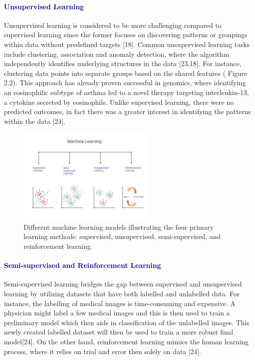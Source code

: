 \documentclass[12pt,a4paper]{article}
\begin{document}
\paragraph{\textcolor{darkblue}{Unsupervised Learning}} 
Unsupervised learning is considered to be more challenging compared to supervised learning since the former focuses on discovering patterns or groupings within data without predefined targets [18]. Common unsupervised learning tasks include clustering, association and anomaly detection, where the algorithm independently identifies underlying structures in the data [23,18].
For instance, clustering data points into separate groups based on the shared features ( Figure 2.2). This approach has already proven successful in genomics, where identifying an eosinophilic subtype of asthma led to a novel therapy targeting interleukin-13, a cytokine secreted by eosinophils. Unlike supervised learning, there were no predicted outcomes, in fact there was a greater interest in identifying the patterns within the data [24]. \\

\begin{figure}[h]
    \centering
    \includegraphics[width=0.6\textwidth]{images/ml.png} 
    \caption{Different machine learning models illustrating the four primary learning methods: supervised, unsupervised, semi-supervised, and reinforcement learning.}
    \label{Figure 1}
\end{figure}

\paragraph{\textcolor{darkblue}{Semi-supervised and Reinforcement Learning}}
Semi-supervised learning bridges the gap between supervised and unsupervised learning by utilizing datasets that have both labelled and unlabelled data. For instance, 
the labelling of medical images is time-consuming and expensive. A physician might label a few medical images and this is then used to train a preliminary model which 
then aids in classification of the unlabelled images. This newly created labelled dataset will then be used to train a more robust final model[24]. On the other hand, reinforcement learning mimics the human learning process, where it relies on trial and error then solely on data [24]. \\
\end{document}
